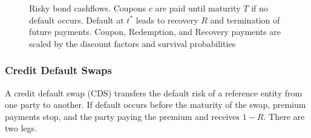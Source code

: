 \begin{figure}[H]
\centering
{}

\caption{
Risky bond cashflows. Coupons $c$ are paid until maturity $T$ if no default occurs. Default at $t^*$ leads to recovery $R$ and termination of future payments. Coupon, Redemption, and Recovery payments are scaled by the discount factors and survival probabilities
}
\end{figure}



\subsubsection*{Credit Default Swaps}

A credit default swap (CDS) transfers the default risk of a reference entity from one party to another. If default occurs before the maturity of the swap, premium payments stop, and the party paying the premium and receives $1-R$. There are two legs.

